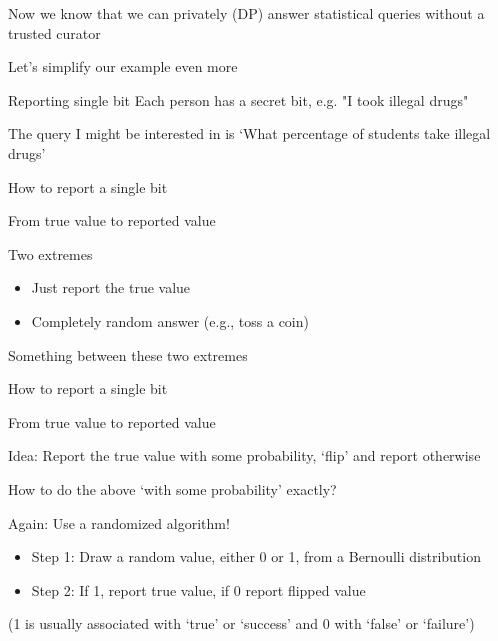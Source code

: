 \documentclass[12pt,aspectratio=169,handout]{beamer}
\begin{document}
Now we know that we can privately (DP) answer statistical queries without a trusted curator

Let's simplify our example even more


\begin{frame}{Reporting single bit}
Each person has a secret bit, e.g. "I took illegal drugs"


The query I might be interested in is `What percentage of students take illegal drugs'

\end{frame}



\begin{frame}{How to report a single bit}

From true value to reported value

Two extremes

\pause

\begin{itemize}
\item Just report the true value
\item Completely random answer (e.g., toss a coin)
\end{itemize}

Something between these two extremes

\end{frame}




\begin{frame}{How to report a single bit}

From true value to reported value

Idea: Report the true value with some probability, `flip' and report otherwise

How to do the above `with some probability' exactly?

Again: Use a randomized algorithm!

\begin{itemize}
\item Step 1: Draw a random value, either 0 or 1, from a Bernoulli distribution
\item Step 2: If 1, report true value, if 0 report flipped value
\end{itemize}

(1 is usually associated with `true' or `success' and 0 with `false' or `failure')

\end{frame}
\end{document}
